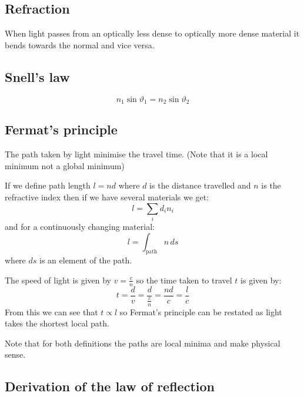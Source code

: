 \documentclass{article}
\begin{document}
\subsection*{Refraction}

\begin{center}
\end{center}

When light passes from an optically less dense to optically more dense material it bends towards the normal and vice versa.

\subsection*{Snell's law}

\[n_1\sin\vartheta_1=n_2\sin\vartheta_2\]

\subsection*{Fermat's principle}

The path taken by light minimise the travel time. (Note that it is a local minimum not a global minimum)

If we define path length \(l=nd\) where \(d\) is the distance travelled and \(n\) is the refractive index then if we have several materials we get:
\[l=\sum_id_in_i\]
and for a continuously changing material:
\[l=\int_{\text{path}}n\,ds\]
where \(ds\) is an element of the path.

The speed of light is given by \(v=\frac cn\) so the time taken to travel \(t\) is given by:
\[t=\frac dv=\frac{d}{\frac{c}{n}}=\frac{nd}{c}=\frac lc\]
From this we can see that \(t\propto l\) so Fermat's principle can be restated as light takes the shortest local path.

Note that for both definitions the paths are local minima and make physical sense.

\subsection*{Derivation of the law of reflection}
\end{document}
